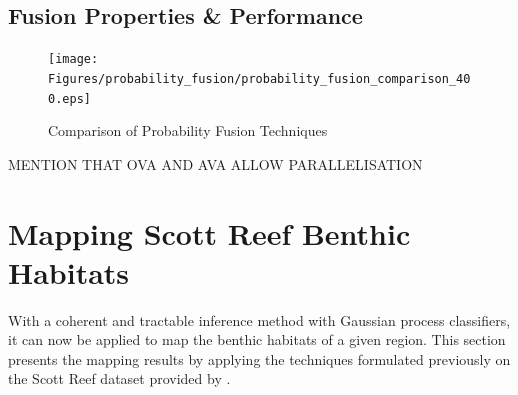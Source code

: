 		\subsection{Fusion Properties \& Performance}
		\label{BenthicHabitatMapping:Classification:Performance}
			


			\begin{figure}[!htbp]
			\centering
				\texttt{[image: Figures/probability\_fusion/probability\_fusion\_comparison\_400.eps]}
			\caption{Comparison of Probability Fusion Techniques}
			\label{Figure:ProbabilityFusion}
			\end{figure}
			
				MENTION THAT OVA AND AVA ALLOW PARALLELISATION
				
	\section{Mapping Scott Reef Benthic Habitats}
	\label{BenthicHabitatMapping:ScottReef}

		With a coherent and tractable inference method with Gaussian process classifiers, it can now be applied to map the benthic habitats of a given region. This section presents the mapping results by applying the techniques formulated previously on the Scott Reef dataset provided by \cite{IMOS}.  

